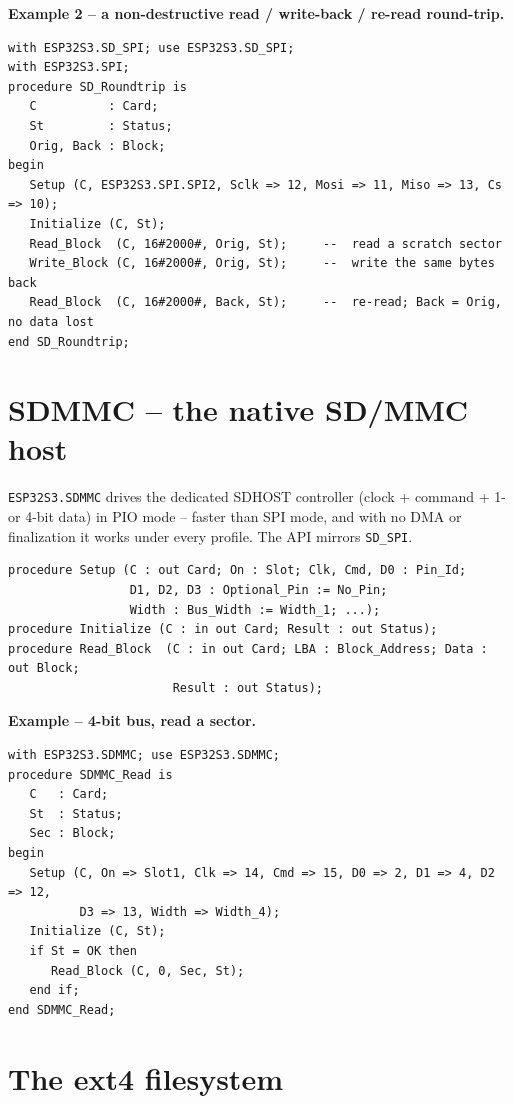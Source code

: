 \textbf{Example 2 -- a non-destructive read / write-back / re-read round-trip.}
\begin{lstlisting}
with ESP32S3.SD_SPI; use ESP32S3.SD_SPI;
with ESP32S3.SPI;
procedure SD_Roundtrip is
   C          : Card;
   St         : Status;
   Orig, Back : Block;
begin
   Setup (C, ESP32S3.SPI.SPI2, Sclk => 12, Mosi => 11, Miso => 13, Cs => 10);
   Initialize (C, St);
   Read_Block  (C, 16#2000#, Orig, St);     --  read a scratch sector
   Write_Block (C, 16#2000#, Orig, St);     --  write the same bytes back
   Read_Block  (C, 16#2000#, Back, St);     --  re-read; Back = Orig, no data lost
end SD_Roundtrip;
\end{lstlisting}

\section{SDMMC -- the native SD/MMC host}

\texttt{ESP32S3.SDMMC} drives the dedicated SDHOST controller (clock + command +
1- or 4-bit data) in PIO mode -- faster than SPI mode, and with no DMA or
finalization it works under every profile. The API mirrors \texttt{SD\_SPI}.

\begin{lstlisting}
procedure Setup (C : out Card; On : Slot; Clk, Cmd, D0 : Pin_Id;
                 D1, D2, D3 : Optional_Pin := No_Pin;
                 Width : Bus_Width := Width_1; ...);
procedure Initialize (C : in out Card; Result : out Status);
procedure Read_Block  (C : in out Card; LBA : Block_Address; Data : out Block;
                       Result : out Status);
\end{lstlisting}

\textbf{Example -- 4-bit bus, read a sector.}
\begin{lstlisting}
with ESP32S3.SDMMC; use ESP32S3.SDMMC;
procedure SDMMC_Read is
   C   : Card;
   St  : Status;
   Sec : Block;
begin
   Setup (C, On => Slot1, Clk => 14, Cmd => 15, D0 => 2, D1 => 4, D2 => 12,
          D3 => 13, Width => Width_4);
   Initialize (C, St);
   if St = OK then
      Read_Block (C, 0, Sec, St);
   end if;
end SDMMC_Read;
\end{lstlisting}

\section{The ext4 filesystem}

